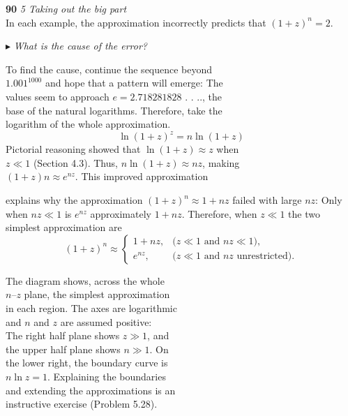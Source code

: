 \documentclass{book}
\begin{document}

\newpage


\large\textbf{90} \hfill \textit{5 Taking out the big part} \\

\Large\noindent In each example, the approximation incorrectly predicts that $(1 + z)^n = 2$.
\begin{flushleft}
$\blacktriangleright$ \textit{What is the cause of the error?}
\end{flushleft}\par\medskip
\begin{minipage}{\textwidth}
 \Large\noindent  To find the cause, continue the sequence beyond\\
$1.001^{1000}$ and hope that a pattern will emerge: The\\
values seem to approach $e = 2.718281828$ . . .., the\\
base of the natural logarithms. Therefore, take the\\
logarithm of the whole approximation.\\
\begin{equation}
\ln{(1+z)^z}=n\ln{(1+z)}
\end{equation}
Pictorial reasoning showed that $\ln{(1 + z)}\approx {z}$ when\\
$z \ll 1$ (Section 4.3). Thus, $n \ln{(1 + z)}\approx {nz}$, making\\
$(1 + z)n\approx {e^{nz}}$. This improved approximation\\ 
\end{minipage} 
\Large\textrm{explains why the approximation $(1 + z)^n\approx 1 + nz$ failed with large $nz$:
Only when $nz \ll 1$ is $e^{nz}$ approximately $1 + nz$. Therefore, when $z \ll 1$
the two simplest approximation are}
\begin{equation}
(1 + z)^n \approx
\begin{cases}
1+nz, & \text{($z\ll  1$ and $nz\ll 1$),} \\
e^{nz}, & \text{($z\ll 1$ and $nz$ unrestricted).}
\end{cases}
\end{equation}
\begin{minipage}{\textwidth}
\noindent The diagram shows, across the whole\\
$n$--$z$ plane, the simplest approximation\\
in each region. The axes are logarithmic\\
and $n$ and $z$ are assumed positive:\\
The right half plane shows $z\gg 1$, and\\
the upper half plane shows $n\gg 1$. On\\
the lower right, the boundary curve is\\
$n \ln{z} = 1$. Explaining the boundaries\\
and extending the approximations is an\\
instructive exercise (Problem 5.28).\\
\end{minipage}\par\medskip
\end{document}

